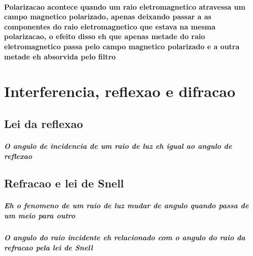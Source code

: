 \documentclass[12pt,twoside, a4paper, twocolumn]{article}
\newcommand{\drawvector} [9] [color=cyan] {
    \draw[line width=1.5pt,#1,-stealth](axis cs: #2, #3)--(axis cs: #4, #5) node[anchor=south west]{$#6$};

    

\ifthenelse{\equal{#7}{true}}{
    \draw[line width=1pt,#1, dashed](axis cs: #4, #5)--(axis cs: #4, 0) node[anchor= north west]{$#8$};
    \draw[line width=1pt,#1, dashed](axis cs: #4, #5)--(axis cs: 0, #5) node[anchor=south east]{$#9$};
    }
    {}
}
\begin{document}
\paragraph*{Polarizacao acontece quando um raio eletromagnetico atravessa um campo magnetico polarizado, apenas deixando passar a as componentes do  raio eletromagnetico que estava na mesma polarizacao, o efeito disso eh que apenas metade do raio eletromagnetico passa pelo campo magnetico polarizado e a outra metade eh absorvida pelo filtro}

\section{Interferencia, reflexao e difracao}
\subsection{Lei da reflexao}
\subparagraph*{O angulo de incidencia de um raio de luz eh igual ao angulo de reflexao}
\subsection{Refracao e lei de Snell}
\subparagraph*{Eh o fenomeno de um raio de luz mudar de angulo quando passa de um meio para outro}
\subparagraph*{O angulo do raio incidente eh relacionado com o angulo do raio da refracao pela lei de Snell}
\subparagraph*{}

\begin{adjustbox}{scale=0.9}
\end{adjustbox}
\end{document}
